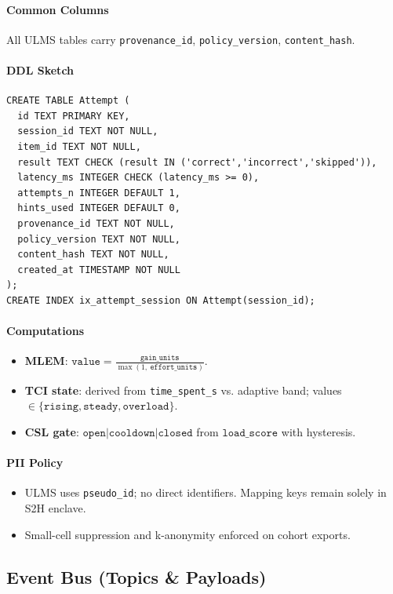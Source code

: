 \documentclass[11pt]{article}
\theoremstyle{plain}
\begin{document}
\paragraph{Common Columns}
All ULMS tables carry \texttt{provenance\_id}, \texttt{policy\_version}, \texttt{content\_hash}.

\paragraph{DDL Sketch}
\begin{verbatim}
CREATE TABLE Attempt (
  id TEXT PRIMARY KEY,
  session_id TEXT NOT NULL,
  item_id TEXT NOT NULL,
  result TEXT CHECK (result IN ('correct','incorrect','skipped')),
  latency_ms INTEGER CHECK (latency_ms >= 0),
  attempts_n INTEGER DEFAULT 1,
  hints_used INTEGER DEFAULT 0,
  provenance_id TEXT NOT NULL,
  policy_version TEXT NOT NULL,
  content_hash TEXT NOT NULL,
  created_at TIMESTAMP NOT NULL
);
CREATE INDEX ix_attempt_session ON Attempt(session_id);
\end{verbatim}

\paragraph{Computations}
\begin{itemize}
  \item \textbf{MLEM}: \(\texttt{value}=\frac{\texttt{gain\_units}}{\max(1,\ \texttt{effort\_units})}\).
  \item \textbf{TCI state}: derived from \texttt{time\_spent\_s} vs. adaptive band; values \(\in\{\texttt{rising},\texttt{steady},\texttt{overload}\}\).
  \item \textbf{CSL gate}: \(\texttt{open|cooldown|closed}\) from \(\texttt{load\_score}\) with hysteresis.
\end{itemize}

\paragraph{PII Policy}
\begin{itemize}
  \item ULMS uses \texttt{pseudo\_id}; no direct identifiers. Mapping keys remain solely in S2H enclave.
  \item Small-cell suppression and k-anonymity enforced on cohort exports.
\end{itemize}

\bigskip
\subsection{Event Bus (Topics \& Payloads)}\label{sec:event-bus}
\end{document}
